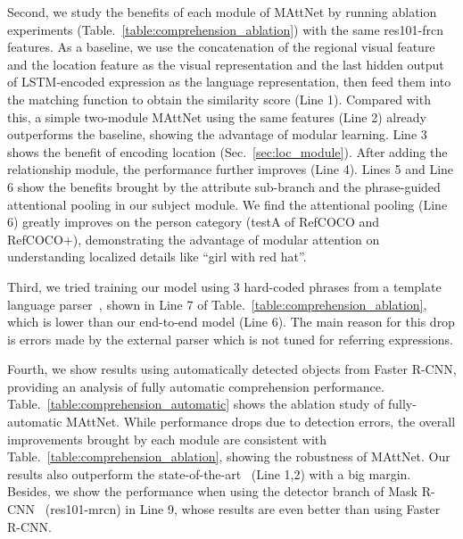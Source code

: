Second, we study the benefits of each module of MAttNet by running ablation experiments (Table.~\ref{table:comprehension_ablation}) with the same res101-frcn features.
As a baseline, we use the concatenation of the regional visual feature and the location feature as the visual representation and the last hidden output of LSTM-encoded expression as the language representation, then feed them into the matching function to obtain the similarity score (Line 1).
Compared with this, a simple two-module MAttNet using the same features (Line 2) already outperforms the baseline, showing the advantage of modular learning.
Line 3 shows the benefit of encoding location (Sec.~\ref{sec:loc_module}).
After adding the relationship module, the performance further improves (Line 4).
Lines 5 and Line 6 show the benefits brought by the attribute sub-branch and the phrase-guided attentional pooling in our subject module.
We find the attentional pooling (Line 6) greatly improves on the person category (testA of RefCOCO and RefCOCO+), demonstrating the advantage of modular attention on understanding localized details like ``girl with red hat''.

Third, we tried training our model using 3 hard-coded phrases from a template language parser~\cite{kazemzadeh2014referitgame}, shown in Line 7 of Table.~\ref{table:comprehension_ablation}, which is  lower than our end-to-end model (Line 6).
The main reason for this drop is errors made by the external parser which is not tuned for referring expressions.

Fourth, we show results using automatically detected objects from Faster R-CNN, providing an analysis of fully automatic comprehension performance.
Table.~\ref{table:comprehension_automatic} shows the ablation study of fully-automatic MAttNet.
While performance drops due to detection errors, the overall improvements brought by each module are consistent with Table.~\ref{table:comprehension_ablation}, showing the robustness of MAttNet.
Our results also outperform the state-of-the-art~\cite{yu2016joint} (Line 1,2) with a big margin.
Besides, we show the performance when using the detector branch of Mask R-CNN~\cite{he2017mask} (res101-mrcn) in Line 9, whose results are even better than using Faster R-CNN. 

